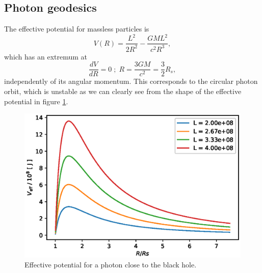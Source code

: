 \documentclass[journal, a4paper]{IEEEtran}
\begin{document}
\subsection{Photon geodesics}
The effective potential for massless particles is
\begin{equation}
	V(R) = \frac{L^2}{2R^2} - \frac{GML^2}{c^2R^3},
\end{equation}
which has an extremum at
\begin{equation}
	\frac{dV}{dR} = 0 \; ; \; R = \frac{3GM}{c^2} = \frac{3}{2} R_s,
\end{equation}
independently of its angular momentum. This corresponds to the circular photon orbit, which is unstable as we can clearly see from the shape of the effective potential in figure \ref{fig::veffphotons}.
\begin{figure}[!hbt]
	\begin{center}
	\includegraphics[width=\columnwidth]{Veff_photon.eps}
	\caption{Effective potential for a photon close to the black hole.}
	\label{fig::veffphotons}
\end{center}
\end{figure}
\end{document}
